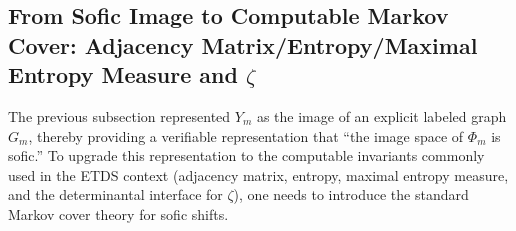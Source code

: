 \subsection{From Sofic Image to Computable Markov Cover: Adjacency Matrix/Entropy/Maximal Entropy Measure and \texorpdfstring{$\zeta$}{zeta}}\label{subsec:Phi_m-fischer}
The previous subsection represented $Y_m$ as the image of an explicit labeled graph $G_m$, thereby providing a verifiable representation that ``the image space of $\Phi_m$ is sofic.'' To upgrade this representation to the computable invariants commonly used in the ETDS context (adjacency matrix, entropy, maximal entropy measure, and the determinantal interface for \(\zeta\)), one needs to introduce the standard Markov cover theory for sofic shifts.










